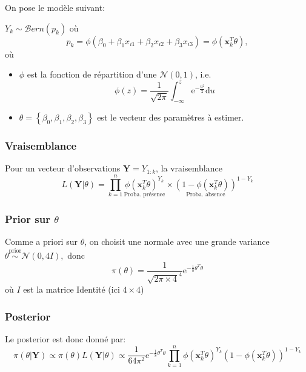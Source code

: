 \documentclass[]{article}
\providecommand{\tightlist}{%
  \setlength{\itemsep}{0pt}\setlength{\parskip}{0pt}}
\begin{document}
On pose le modèle suivant:

\(Y_k \sim \mathcal{B}ern(p_k)\) où
\[p_k = \phi(\beta_0 + \beta_1 x_{i1} + \beta_2x_{i2} + \beta_3 x_{i3}) = \phi(\mathbf{x}_k^T\theta),\]
où

\begin{itemize}
\tightlist
\item
  \(\phi\) est la fonction de répartition d'une \(\mathcal{N}(0, 1)\),
  i.e.
  \[\phi(z) = \frac{1}{\sqrt{2\pi}}\int_{-\infty}^z \text{e}^{-\frac{u^2}{2}}\text{d}u\]
\item
  \(\theta = \left\lbrace \beta_0, \beta_1, \beta_2, \beta_3\right\rbrace\)
  est le vecteur des paramètres à estimer.
\end{itemize}

\hypertarget{vraisemblance}{%
\subsubsection{Vraisemblance}\label{vraisemblance}}

Pour un vecteur d'observations \(\mathbf{Y} = Y_{1:k}\), la
vraisemblance
\[L(\mathbf{Y}\vert \theta) = \prod_{k = 1}^n \underset{\text{Proba. présence}}{\phi(\mathbf{x}_k^T\theta)^{Y_k}}\times \underset{\text{Proba. absence}}{(1 - \phi(\mathbf{x}_k^T\theta))}^{1 - Y_k}\]

\hypertarget{prior-sur-theta}{%
\subsubsection{\texorpdfstring{Prior sur
\(\theta\)}{Prior sur \textbackslash{}theta}}\label{prior-sur-theta}}

Comme a priori sur \(\theta\), on choisit une normale avec une grande
variance\(\theta \overset{\text{prior}}{\sim} \mathcal{N}(0, 4 I),\)
donc
\[\pi(\theta) = \frac{1}{\sqrt{2\pi \times 4}^4} \text{e}^{-\frac{1}{8}\theta^T\theta}\]
où \(I\) est la matrice Identité (ici \(4 \times 4\))

\hypertarget{posterior}{%
\subsubsection{Posterior}\label{posterior}}

Le posterior est donc donné par:
\[\pi(\theta \vert \mathbf{Y}) \propto \pi(\theta) L(\mathbf{Y}\vert \theta) \propto \frac{1}{64\pi^2}\text{e}^{-\frac{1}{8}\theta^T\theta} \prod_{k = 1}^n \phi(\mathbf{x}_k^T\theta)^{Y_k} (1 - \phi(\mathbf{x}_k^T\theta))^{1 - Y_k}\]
\end{document}
